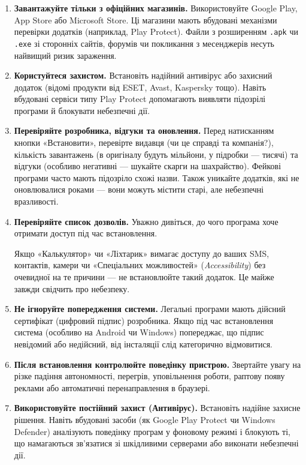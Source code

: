 \begin{enumerate}
    \item \textbf{Завантажуйте тільки з офіційних магазинів.}
    Використовуйте Google Play, App Store або Microsoft Store. Ці магазини мають вбудовані механізми перевірки додатків (наприклад, Play Protect). Файли з розширенням \texttt{.apk} чи \texttt{.exe} зі сторонніх сайтів, форумів чи покликання з месенджерів несуть найвищий ризик зараження.

    \item \textbf{Користуйтеся захистом.}
    Встановіть надійний антивірус або захисний додаток (відомі продукти від ESET, Avast, Kaspersky тощо). Навіть вбудовані сервіси типу Play Protect допомагають виявляти підозрілі програми й блокувати небезпечні дії.

    \item \textbf{Перевіряйте розробника, відгуки та оновлення.}
    Перед натисканням кнопки «Встановити», перевірте видавця (чи це справді та компанія?), кількість завантажень (в оригіналу будуть мільйони, у підробки — тисячі) та відгуки (особливо негативні — шукайте скарги на шахрайство). Фейкові програми часто мають підозріло схожі назви. Також уникайте додатків, які не оновлювалися роками — вони можуть містити старі, але небезпечні вразливості.

    \newpage

    \item \textbf{Перевіряйте список дозволів.}
    Уважно дивіться, до чого програма хоче отримати доступ під час встановлення. 
  
    
    Якщо «Калькулятор» чи «Ліхтарик» вимагає доступу до ваших SMS, контактів, камери чи «Спеціальних можливостей» (\textit{Accessibility}) без очевидної на те причини — не встановлюйте такий додаток. Це майже завжди свідчить про небезпеку.

    \item \textbf{Не ігноруйте попередження системи.}
    Легальні програми мають дійсний сертифікат (цифровий підпис) розробника. Якщо під час встановлення система (особливо на Android чи Windows) попереджає, що підпис невідомий або недійсний, від інсталяції слід категорично відмовитися.

    \item \textbf{Після встановлення контролюйте поведінку пристрою.}
    Звертайте увагу на різке падіння автономності, перегрів, уповільнення роботи, раптову появу реклами або автоматичні перенаправлення в браузері.

    \item \textbf{Використовуйте постійний захист (Антивірус).}
    Встановіть надійне захисне рішення. Навіть вбудовані засоби (як Google Play Protect чи Windows Defender) аналізують поведінку програм у фоновому режимі і блокують ті, що намагаються зв'язатися зі шкідливими серверами або виконати небезпечні дії.
\end{enumerate}

